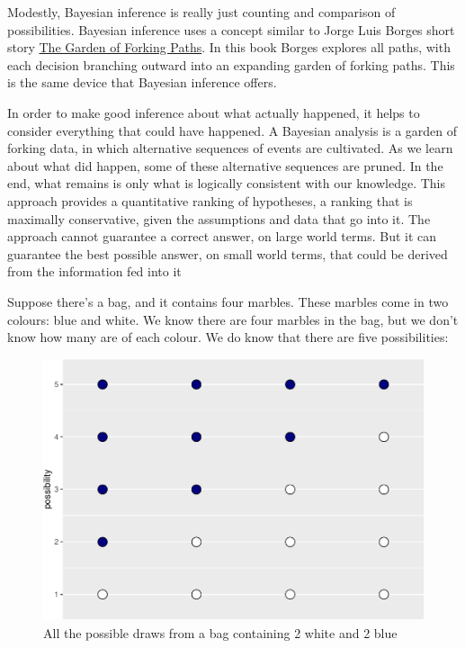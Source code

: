 \documentclass{article}
\begin{document}
Modestly, Bayesian inference is really just counting and comparison of
possibilities. Bayesian inference uses a concept similar to Jorge Luis
Borges short story
\href{https://en.wikipedia.org/wiki/The_Garden_of_Forking_Paths}{The
Garden of Forking Paths}. In this book Borges explores all paths, with
each decision branching outward into an expanding garden of forking
paths. This is the same device that Bayesian inference offers.

In order to make good inference about what actually happened, it helps
to consider everything that could have happened. A Bayesian analysis is
a garden of forking data, in which alternative sequences of events are
cultivated. As we learn about what did happen, some of these alternative
sequences are pruned. In the end, what remains is only what is logically
consistent with our knowledge. This approach provides a quantitative
ranking of hypotheses, a ranking that is maximally conservative, given
the assumptions and data that go into it. The approach cannot guarantee
a correct answer, on large world terms. But it can guarantee the best
possible answer, on small world terms, that could be derived from the
information fed into it

Suppose there's a bag, and it contains four marbles. These marbles come
in two colours: blue and white. We know there are four marbles in the
bag, but we don't know how many are of each colour. We do know that
there are five possibilities:

\begin{figure}

{\centering \includegraphics{qrap_paper_files/figure-latex/possibilities-1} 

}

\caption{All the possible draws from a bag containing 2 white and 2 blue}\label{fig:possibilities}
\end{figure}
\end{document}
